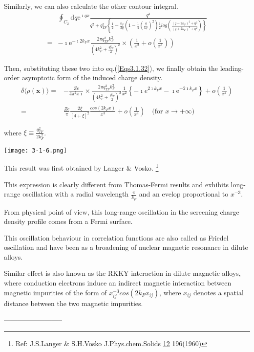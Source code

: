 \begin{itemize}
Similarly, we can also calculate the other contour integral.
\begin{equation} \label{Eqs3.1.35} \begin{split}
&\oint_{C_2} \mathrm{d} q \mathrm{e}^{\imath q x} \frac{q^3}{q^2 + q_{TF}^2 \left\{\frac{1}{2}-\frac{k_F}{2q}\left( 1-\frac{1}{4}(\frac{q}{k_F})^2 \right) \frac{1}{2} log \left( \frac{(q-2 k_F)^2 + \eta^2}{(q + 2 k_F)^2 + \eta^2}\right) \right\}}\\
=& -\imath \mathrm{e}^{-\imath 2 k_F x} \frac{2\pi q_{TF}^2 k_F^2}{\left( 4 k_F^2 + \frac{q_{TF}^2}{2} \right)^2} \times \left( \frac{1}{x^2} + o(\frac{1}{x^3}) \right)
\end{split}\end{equation}

Then, substituting these two into eq.(\ref{Eqs3.1.32}), we finally obtain the leading-order asymptotic form of the induced charge density.
\begin{equation} \label{Eqs3.1.36} \begin{split}
\delta \langle \rho(\mathbf{x}) \rangle =& -\frac{Z e}{4\pi^2 x \imath} \times \frac{2\pi q_{TF}^2 k_F^2}{\left( 4 k_F^2 + \frac{q_{TF}^2}{2} \right)^2} \frac{1}{x^2} \left\{ -\imath e^{2\imath k_F x} -\imath \mathrm{e}^{-2\imath k_F x} \right\} + o(\frac{1}{x^4})\\
=& \frac{Z e}{\pi} \frac{2 \xi}{[4+\xi]^2} \frac{cos(2 k_F x)}{x^3} + o(\frac{1}{x^4})\quad\text{(for $x \rightarrow +\infty$)}
\end{split}\end{equation}

where $\xi \equiv \frac{q_{TF}^2}{2 k_F^2}$.
\begin{center} \label{Fig3.1.6}
\texttt{[image: 3-1-6.png]}
\end{center}

This result was first obtained by Langer \& Vosko.
\footnote{Ref: J.S.Langer \& S.H.Vosko J.Phys.chem.Solids \underline{12} 196(1960)}

This expression is clearly different from Thomas-Fermi results and exhibits long-range oscillation with a radial wavelength $\frac{\pi}{k_F}$ and an evelop proportional to $x^{-3}$.

From physical point of view, this long-range oscillation in the screening charge density profile comes from a Fermi surface.

This oscillation behaviour in correlation functions are also called as Friedel oscillation and have been as a broadening of nuclear magnetic resonance in dilute alloys.

Similar effect is also known as the RKKY interaction in dilute magnetic alloys, where conduction electrons induce an indirect magnetic interaction between magnetic impurities of the form of $x_{ij}^{-3} cos(2 k_F x_{ij})$, where $x_{ij}$ denotes a spatial distance between the two magnetic impurities.
\end{itemize}
\begin{center}--------------------------\end{center}

